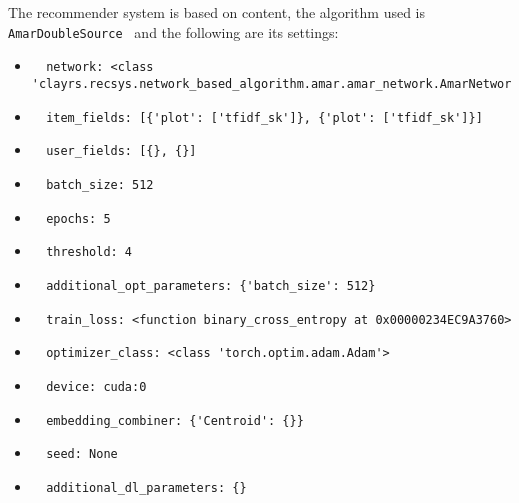 \documentclass[11pt]{article}
\begin{document}
The recommender system is based on content, the algorithm used
is \verb| AmarDoubleSource | and the following are its settings:
\begin{itemize}
\item \begin{verbatim}
  network: <class 'clayrs.recsys.network_based_algorithm.amar.amar_network.AmarNetworkMerge'>
\end{verbatim}
\item \begin{verbatim}
  item_fields: [{'plot': ['tfidf_sk']}, {'plot': ['tfidf_sk']}]
\end{verbatim}
\item \begin{verbatim}
  user_fields: [{}, {}]
\end{verbatim}
\item \begin{verbatim}
  batch_size: 512
\end{verbatim}
\item \begin{verbatim}
  epochs: 5
\end{verbatim}
\item \begin{verbatim}
  threshold: 4
\end{verbatim}
\item \begin{verbatim}
  additional_opt_parameters: {'batch_size': 512}
\end{verbatim}
\item \begin{verbatim}
  train_loss: <function binary_cross_entropy at 0x00000234EC9A3760>
\end{verbatim}
\item \begin{verbatim}
  optimizer_class: <class 'torch.optim.adam.Adam'>
\end{verbatim}
\item \begin{verbatim}
  device: cuda:0
\end{verbatim}
\item \begin{verbatim}
  embedding_combiner: {'Centroid': {}}
\end{verbatim}
\item \begin{verbatim}
  seed: None
\end{verbatim}
\item \begin{verbatim}
  additional_dl_parameters: {}
\end{verbatim}
\end{itemize}
\end{document}
